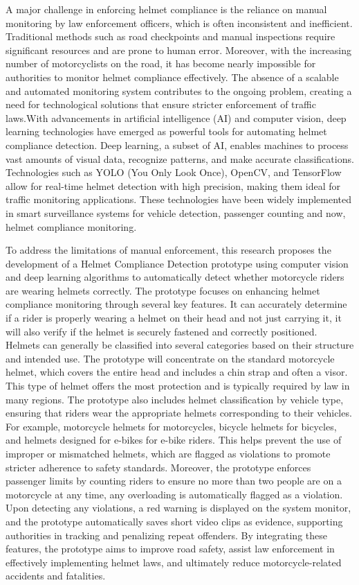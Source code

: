 \begin{refsection}
A major challenge in enforcing helmet compliance is the reliance on manual monitoring by law enforcement officers, which is often inconsistent and inefficient. Traditional methods such as road checkpoints and manual inspections require significant resources and are prone to human error. Moreover, with the increasing number of motorcyclists on the road, it has become nearly impossible for authorities to monitor helmet compliance effectively. The absence of a scalable and automated monitoring system contributes to the ongoing problem, creating a need for technological solutions that ensure stricter enforcement of traffic laws.With advancements in artificial intelligence (AI) and computer vision, deep learning technologies have emerged as powerful tools for automating helmet compliance detection. Deep learning, a subset of AI, enables machines to process vast amounts of visual data, recognize patterns, and make accurate classifications. Technologies such as YOLO (You Only Look Once), OpenCV, and TensorFlow allow for real-time helmet detection with high precision, making them ideal for traffic monitoring applications. These technologies have been widely implemented in smart surveillance systems for vehicle detection, passenger counting and now, helmet compliance monitoring.


To address the limitations of manual enforcement, this research proposes the development of a Helmet Compliance Detection prototype using computer vision and deep learning algorithms to automatically detect whether motorcycle riders are wearing helmets correctly. The prototype focuses on enhancing helmet compliance monitoring through several key features. It can accurately determine if a rider is properly wearing a helmet on their head and not just carrying it,  it will  also verify if the helmet is securely fastened and correctly positioned.  Helmets can generally be classified into several categories based on their structure and intended use. The prototype will concentrate on the standard motorcycle helmet, which covers the entire head and includes a chin strap and often a visor. This type of helmet offers the most protection and is typically required by law in many regions. The prototype also includes helmet classification by vehicle type, ensuring that riders wear the appropriate helmets corresponding to their vehicles. For example, motorcycle helmets for motorcycles, bicycle helmets for bicycles, and helmets designed for e-bikes for e-bike riders. This helps prevent the use of improper or mismatched helmets, which are flagged as violations to promote stricter adherence to safety standards.
Moreover, the prototype enforces passenger limits by counting riders to ensure no more than two people are on a motorcycle at any time, any overloading is automatically flagged as a violation. Upon detecting any violations,  a red warning is displayed on the system monitor, and the prototype automatically saves short video clips as evidence, supporting authorities in tracking and penalizing repeat offenders. By integrating these features, the prototype aims to improve road safety, assist law enforcement in effectively implementing helmet laws, and ultimately reduce motorcycle-related accidents and fatalities.



\end{refsection}
